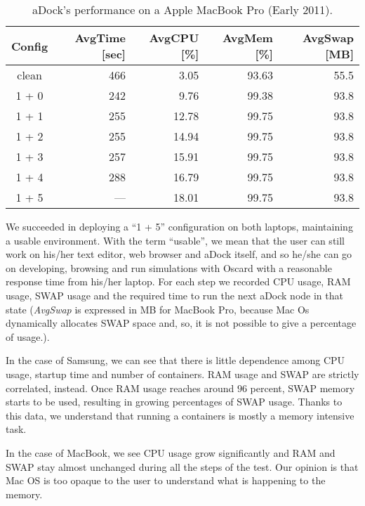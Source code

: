 \begin{table}[h!]
\centering
  \begin{tabular}{| c | r | r | r | r |}
  \hline
  \textbf{Config} & \textbf{AvgTime [sec]} & \textbf{AvgCPU [\%]} & \textbf{AvgMem [\%]} & \textbf{AvgSwap [MB]}  \\
  \hline
  clean & 466 & 3.05 & 93.63 & 55.5 \\
  \hline
  1 + 0 & 242 & 9.76 & 99.38 & 93.8 \\
  \hline
  1 + 1 & 255 & 12.78 & 99.75 & 93.8 \\
  \hline
  1 + 2 & 255 & 14.94 & 99.75 & 93.8 \\
  \hline
  1 + 3 & 257 & 15.91 & 99.75 & 93.8 \\
  \hline
  1 + 4 & 288 & 16.79 & 99.75 & 93.8 \\
  \hline
  1 + 5 & --- & 18.01 & 99.75 & 93.8 \\
  \hline
  \end{tabular}
  \vspace{2mm}
  \caption{aDock's performance on a Apple MacBook Pro (Early 2011).}
  \label{tab:adock_macpro}
\end{table}

We succeeded in deploying a ``1 + 5'' configuration on both laptops, maintaining a usable environment. With the term ``usable'', we mean that the user can still work on his/her text editor, web browser and aDock itself, and so he/she can go on developing, browsing and run simulations with Oscard with a reasonable response time from his/her laptop. For each step we recorded CPU usage, RAM usage, SWAP usage and the required time to run the next aDock node in that state (\textit{AvgSwap} is expressed in MB for MacBook Pro, because Mac Os dynamically allocates SWAP space and, so, it is not possible to give a percentage of usage.).

In the case of Samsung, we can see that there is little dependence among CPU usage, startup time and number of containers. RAM usage and SWAP are strictly correlated, instead. Once RAM usage reaches around $96$ percent, SWAP memory starts to be used, resulting in growing percentages of SWAP usage. Thanks to this data, we understand that running a containers is mostly a memory intensive task.

In the case of MacBook, we see CPU usage grow significantly and RAM and SWAP stay almost unchanged during all the steps of the test. Our opinion is that Mac OS is too opaque to the user to understand what is happening to the memory.


